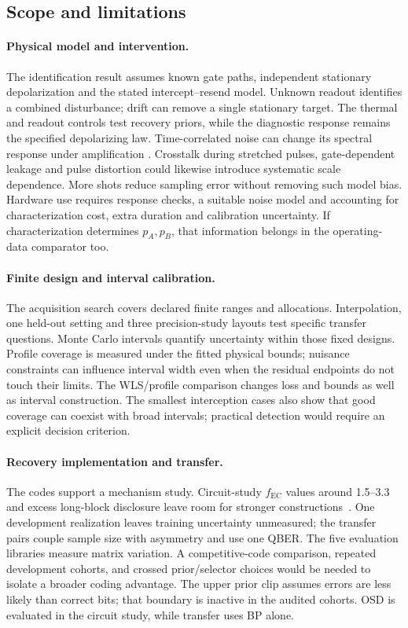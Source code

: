 \documentclass[manuscript,screen,review,anonymous]{acmart}
\begin{document}
\subsection{Scope and limitations}
\label{sec:limits}
\paragraph{Physical model and intervention.}
The identification result assumes known gate paths, independent stationary
depolarization and the stated intercept--resend model. Unknown readout
identifies a combined disturbance; drift can remove a single stationary
target. The thermal and readout controls test recovery priors, while the
diagnostic response remains the specified depolarizing law.
Time-correlated noise can change its spectral response under amplification
\cite{schultz2022}. Crosstalk during stretched pulses, gate-dependent leakage
and pulse distortion could likewise introduce systematic scale dependence.
More shots reduce sampling error without removing such model bias.
Hardware use requires response checks, a suitable noise model and accounting
for characterization cost, extra duration and calibration uncertainty.
If characterization determines $p_A,p_B$, that information belongs in the
operating-data comparator too.

\paragraph{Finite design and interval calibration.}
The acquisition search covers declared finite ranges and allocations.
Interpolation, one held-out setting and three precision-study layouts test
specific transfer questions. Monte Carlo intervals quantify uncertainty
within those fixed designs. Profile coverage is measured under the fitted
physical bounds; nuisance constraints can influence interval width even when
the residual endpoints do not touch their limits. The WLS/profile comparison
changes loss and bounds as well as interval construction. The smallest
interception cases also show that good coverage can coexist with broad
intervals; practical detection would require an explicit decision criterion.

\paragraph{Recovery implementation and transfer.}
The codes support a mechanism study. Circuit-study $f_{\mathrm{EC}}$ values
around 1.5--3.3 and excess long-block disclosure leave room for stronger
constructions~\cite{elkouss2009,borisov2023}. One development realization
leaves training uncertainty unmeasured; the transfer pairs couple sample
size with asymmetry and use one QBER. The five evaluation libraries measure
matrix variation. A competitive-code comparison, repeated development
cohorts, and crossed prior/selector choices would be needed to isolate a
broader coding advantage. The upper prior clip assumes errors are less
likely than correct bits; that boundary is inactive in the audited cohorts.
OSD is evaluated in the circuit study, while transfer uses BP alone.
\end{document}
